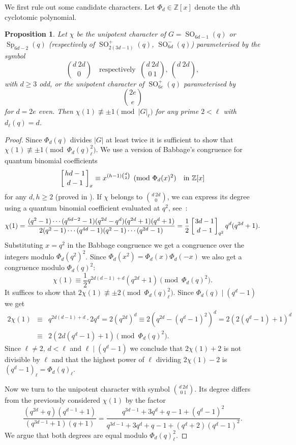 \documentclass{ert-l}
\newcommand{\ZZ}{{\mathbb{Z}}}
\newcommand{\Sp}{{\operatorname{Sp}}}
\newcommand{\SO}{{\operatorname{SO}}}
\newtheorem{prop}[thm]{Proposition}
\theoremstyle{definition}
\theoremstyle{remark}
\begin{document}
We first rule out some candidate characters. Let $\Phi_d\in\ZZ[x]$ denote
the $d$th cyclotomic polynomial.

\begin{prop}   \label{prop:babbage}
 Let $\chi$ be the unipotent character of $G = \SO_{6d-1}(q)$ or $\Sp_{6d-2}(q)$
 (respectively of $\SO_{2(3d-1)}^+(q)$, $\SO_{6d}^-(q)$) parameterised by the
 symbol
 $$\binom{d\ 2d}{0}\quad \text{respectively }\ \binom{d\ 2d}{0\ 1},\
  \binom{d\ 2d}{},$$
 with $d\ge3$ odd, or the unipotent character of $\SO_{6e}^+(q)$
 parameterised by
 $$\binom{2e}{e}$$
 for $d=2e$ even. Then $\chi(1)\not\equiv\pm1\pmod{|G|_\ell}$ for
 any prime $2<\ell$ with $d_\ell(q)=d$.
\end{prop}

\begin{proof}
Since $\Phi_d(q)$ divides $|G|$ at least twice it is sufficient to show that
$\chi(1)\not\equiv\pm1\pmod{\Phi_d(q)_\ell^2}$.
We use a version of Babbage's congruence for quantum binomial coefficients
$$\left[hd-1\atop d-1\right]_x
   \equiv x^{(h-1)\binom{d}{2}}\pmod{\Phi_d(x)^2}\quad\text{in }\ZZ[x]$$
for any $d,h\ge2$ (proved in \cite[Lemma 3.7]{LM15}). If $\chi$ belongs to
$\binom{d\ 2d}{0}$, we can express its degree using a quantum binomial
coefficient evaluated at $q^2$, see~\cite[13.8]{Ca}:
$$\chi(1) = \frac{(q^2-1)\cdots(q^{6d-2}-1)(q^{2d}-q^d)(q^{2d}+1)(q^d+1)}
  {2(q^2-1)\cdots(q^{4d}-1)(q^2-1)\cdots(q^{2d}-1)}
  =\frac{1}{2}\left[3d-1\atop d-1\right]_{q^2}q^d(q^{2d}+1).$$
Substituting $x = q^2$ in the Babbage congruence we get a congruence over
the integers modulo $\Phi_d(q^2)^2$. Since $\Phi_d(x^2) =
\Phi_d(x)\Phi_d(-x)$ we also get a congruence modulo $\Phi_d(q)^2$:
\[\chi(1) \equiv \frac{1}{2} q^{2d(d-1)+d}(q^{2d}+1) \pmod{\Phi_d(q)^2}.\]
It suffices to show that $2\chi(1) \not\equiv \pm 2\pmod{\Phi_d(q)_\ell^2}$.
Since $\Phi_d(q) \mid (q^d-1)$ we get
\[\begin{array}{rcl}
  2\chi(1) &\equiv& q^{2d(d-1)+d} \cdot 2 q^d
   = 2 (q^{2d})^d \equiv 2(q^{2d}-(q^d-1)^2)^d = 2(2(q^d-1)+1)^d \\
  &\equiv& 2 (2d(q^d-1)+1) \pmod{\Phi_d(q)^2}.
\end{array}\]
Since $\ell \neq 2$, $d < \ell$  and $\ell \mid (q^d-1)$ we conclude that
$2\chi(1) + 2$ is not divisible by $\ell$ and that the highest power of
$\ell$ dividing $2\chi(1)-2$ is $(q^d-1)_\ell = \Phi_d(q)_\ell$.

Now we turn to the unipotent character with symbol $\binom{d\ 2d}{0\ 1}$.
Its degree differs from the previously considered $\chi(1)$ by the factor
$$\frac{(q^{2d}+q)(q^{d-1}+1)}{(q^{3d-1}+1)(q+1)}
  =\frac{q^{3d-1}+3q^d+q-1+(q^d-1)^2}{q^{3d-1}+3q^d+q-1+(q^d+2)(q^d-1)^2}.$$
We argue that both degrees are equal modulo $\Phi_d(q)_\ell^2$.


\end{proof}
\end{document}
